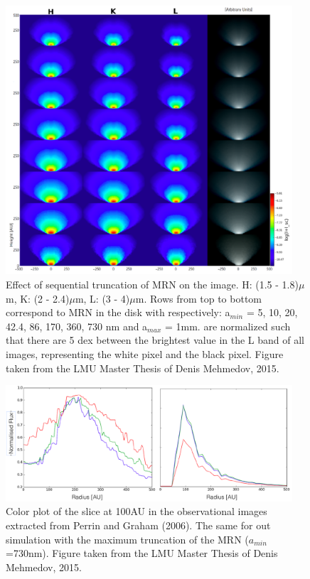 \documentclass[10pt,fleqn,twoside]{article}
\begin{document}
\begin{figure}
  \includegraphics[width=0.95\textwidth]{mrntruncation.pdf}
  \caption{Effect of sequential truncation of MRN on the
    image.  H: (1.5
    - 1.8)$\mu$m, K: (2 - 2.4)$\mu$m, L: (3 - 4)$\mu$m.  Rows from top to
    bottom correspond to MRN in the disk with respectively: a$_{min}$ = 5,
    10, 20, 42.4, 86, 170, 360, 730 nm and a$_{max}$ =
    1mm.  are normalized such
    that there are 5 dex between the brightest value in the L band of all
    images, representing the white pixel and the black pixel. Figure taken
    from the LMU Master Thesis of Denis Mehmedov, 2015.}
  \label{fig:densitygrowth}
\end{figure}


\begin{figure}
  \includegraphics[width=0.95\textwidth]{colorinversion.pdf}
  \caption{ Color plot of the slice at 100AU in
    the observational images extracted from Perrin and Graham
    (2006).  The same for out simulation with the
    maximum truncation of the MRN ($a_{min}$=730nm). Figure taken from the
    LMU Master Thesis of Denis Mehmedov, 2015. }
  \label{fig:colourgrowth}
\end{figure}
\end{document}
